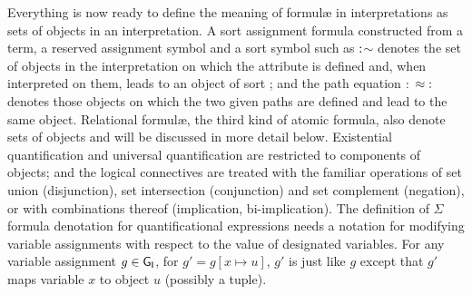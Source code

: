 \documentclass[output=paper
 	        ,biblatex
                ,babelshorthands
                ,newtxmath
                ,draftmode
                ,colorlinks, citecolor=brown
]{langscibook}
\begin{document}
{Everything is now ready to define the meaning of formulæ in
interpretations as sets of objects in an interpretation. A
sort assignment formula constructed from a term, a reserved assignment
symbol and a sort symbol such as
$\operatorname{:}$$\sim$ denotes the set
of objects in the interpretation on which the  attribute
is defined and, when interpreted on them, leads to an object of sort
; and the path equation $\operatorname{:}$ $\approx\operatorname{:}$ denotes those objects on which the two given paths are
defined and lead to the same object. Relational formulæ, the
third kind of atomic formula, also denote sets of objects and will
be discussed in more detail below. Existential quantification and universal
quantification are restricted to components of objects; and the logical
connectives are treated with the familiar operations of set union
(disjunction), set intersection (conjunction) and set complement (negation),
or with combinations thereof (implication, bi-implication).
The definition of $\Sigma$ formula denotation for quantificational
expressions needs a
notation for modifying variable assignments with respect to the
value of designated variables. For any variable assignment $g\in\mathsf{G}_{\mathsf{I}}$,
for $g'=g[x \mapsto u]$, $g'$ is just like $g$ except that
$g'$ maps variable $x$ to object $u$ (possibly a tuple).


}
\end{document}
